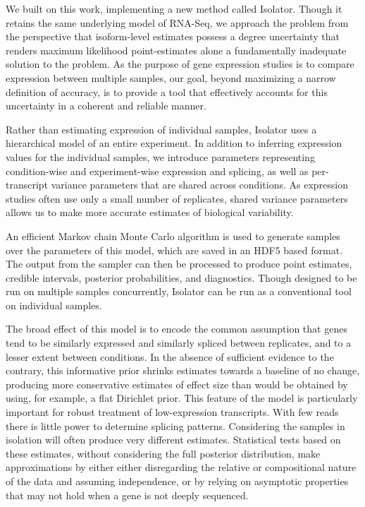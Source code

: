 \documentclass[twocolumn]{article}
\begin{document}
We built on this work, implementing a new method called Isolator. Though
it retains the same underlying model of RNA-Seq, we approach the problem
from the perspective that isoform-level estimates possess a degree
uncertainty that renders maximum likelihood point-estimates alone a
fundamentally inadequate solution to the problem. As the purpose of gene
expression studies is to compare expression between multiple samples,
our goal, beyond maximizing a narrow definition of accuracy, is to
provide a tool that effectively accounts for this uncertainty in a
coherent and reliable manner.

Rather than estimating expression of individual samples, Isolator uses a
hierarchical model of an entire experiment. In addition to inferring
expression values for the individual samples, we introduce parameters
representing condition-wise and experiment-wise expression and splicing,
as well as per-transcript variance parameters that are shared across
conditions. As expression studies often use only a small number of
replicates, shared variance parameters allows us to make more accurate
estimates of biological variability.

An efficient Markov chain Monte Carlo algorithm is used to generate samples over
the parameters of this model, which are saved in an HDF5 \cite{hdf5} based
format. The output from the sampler can then be processed to produce point
estimates, credible intervals, posterior probabilities, and diagnostics. Though
designed to be run on multiple samples concurrently, Isolator can be run as a
conventional tool on individual samples.

The broad effect of this model is to encode the common assumption that
genes tend to be similarly expressed and similarly spliced between
replicates, and to a lesser extent between conditions. In the absence of
sufficient evidence to the contrary, this informative prior shrinks
estimates towards a baseline of no change, producing more conservative
estimates of effect size than would be obtained by using, for example, a
flat Dirichlet prior. This feature of the model is particularly
important for robust treatment of low-expression transcripts. With few reads
there is little power to determine splicing patterns. Considering the
samples in isolation will often produce very different estimates.
Statistical tests based on these estimates, without considering the full
posterior distribution, make approximations by either either
disregarding the relative or compositional nature of the data and
assuming independence, or by relying on asymptotic properties that may
not hold when a gene is not deeply sequenced.
\end{document}
